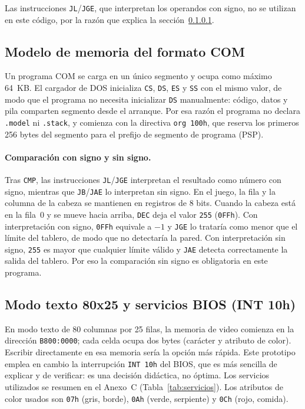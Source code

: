 \documentclass[10pt]{article}
\begin{document}
Las instrucciones \texttt{JL}/\texttt{JGE}, que interpretan los operandos con signo, no se utilizan en este código, por la razón que explica la sección~\ref{sec:signo}.

\subsection{Modelo de memoria del formato COM}
Un programa COM se carga en un único segmento y ocupa como máximo 64~KB. El cargador de DOS inicializa \texttt{CS}, \texttt{DS}, \texttt{ES} y \texttt{SS} con el mismo valor, de modo que el programa no necesita inicializar \texttt{DS} manualmente: código, datos y pila comparten segmento desde el arranque. Por esa razón el programa no declara \texttt{.model} ni \texttt{.stack}, y comienza con la directiva \texttt{org 100h}, que reserva los primeros 256 bytes del segmento para el prefijo de segmento de programa (PSP).

\paragraph{Comparación con signo y sin signo.}\label{sec:signo}
Tras \texttt{CMP}, las instrucciones \texttt{JL}/\texttt{JGE} interpretan el resultado como número con signo, mientras que \texttt{JB}/\texttt{JAE} lo interpretan sin signo. En el juego, la fila y la columna de la cabeza se mantienen en registros de 8 bits. Cuando la cabeza está en la fila~0 y se mueve hacia arriba, \texttt{DEC} deja el valor \texttt{255} (\texttt{0FFh}). Con interpretación con signo, \texttt{0FFh} equivale a $-1$ y \texttt{JGE} lo trataría como menor que el límite del tablero, de modo que no detectaría la pared. Con interpretación sin signo, \texttt{255} es mayor que cualquier límite válido y \texttt{JAE} detecta correctamente la salida del tablero. Por eso la comparación sin signo es obligatoria en este programa.

\subsection{Modo texto 80x25 y servicios BIOS (INT 10h)}
En modo texto de 80 columnas por 25 filas, la memoria de video comienza en la dirección \texttt{B800:0000}; cada celda ocupa dos bytes (carácter y atributo de color). Escribir directamente en esa memoria sería la opción más rápida. Este prototipo emplea en cambio la interrupción \texttt{INT 10h} del BIOS, que es más sencilla de explicar y de verificar: es una decisión didáctica, no óptima. Los servicios utilizados se resumen en el Anexo~C (Tabla~\ref{tab:servicios}). Los atributos de color usados son \texttt{07h} (gris, borde), \texttt{0Ah} (verde, serpiente) y \texttt{0Ch} (rojo, comida).
\end{document}
